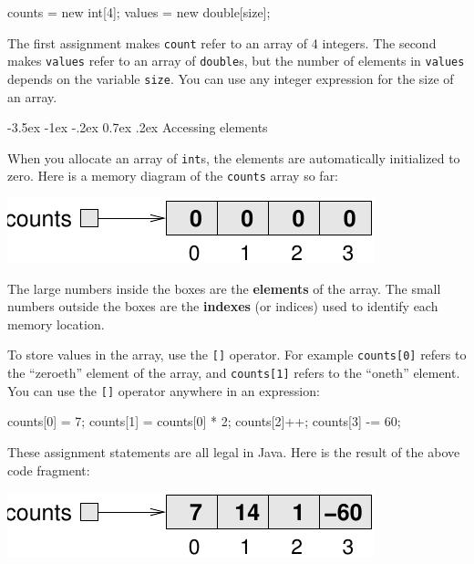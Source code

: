 \documentclass[12pt]{book}
\makeatletter
\theoremstyle{exercise}
\newcommand{\java}[1]{\verb"#1"}
\renewcommand{\section}{\@startsection {section}{1}{\z@}%
    {-3.5ex \@plus -1ex \@minus -.2ex}%
    {0.7ex \@plus.2ex}%
    {\normalfont\Large\bfseries}}
\newcommand{\java}[1]{\lstinline{#1}} %
\makeatother
\begin{document}
\begin{code}
    counts = new int[4];
    values = new double[size];
\end{code}

The first assignment makes \java{count} refer to an array of 4 integers.
The second makes \java{values} refer to an array of \java{double}s, but the number of elements in \java{values} depends on the variable \java{size}.
You can use any integer expression for the size of an array.

\section{Accessing elements}


When you allocate an array of \java{int}s, the elements are automatically initialized to zero.
Here is a memory diagram of the \java{counts} array so far:

\begin{center}
\includegraphics{figs/array.pdf}
\end{center}


The large numbers inside the boxes are the {\bf elements} of the array.
The small numbers outside the boxes are the {\bf indexes} (or indices) used to identify each memory location.

To store values in the array, use the \java{[]} operator.
For example \java{counts[0]} refers to the ``zeroeth'' element of the array, and \java{counts[1]} refers to the ``oneth'' element.  You can use the \java{[]} operator anywhere in an expression:

\begin{code}
    counts[0] = 7;
    counts[1] = counts[0] * 2;
    counts[2]++;
    counts[3] -= 60;
\end{code}

These assignment statements are all legal in Java.
Here is the result of the above code fragment:

\begin{center}
\includegraphics{figs/array2.pdf}
\end{center}
\end{document}
